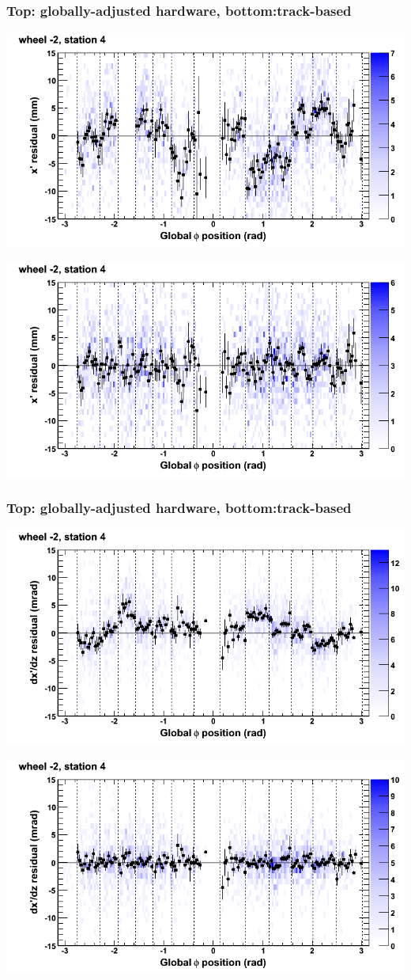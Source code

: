 \documentclass[compress]{beamer}
\begin{document}
\begin{frame}
\frametitle{Top: globally-adjusted hardware, bottom:track-based}
\includegraphics[width=0.7\linewidth]{NOV4_mapplots_HW/DTvsphi_st4whA_x.png}

\includegraphics[width=0.7\linewidth]{NOV4_mapplots/DTvsphi_st4whA_x.png}
\end{frame}

\begin{frame}
\frametitle{Top: globally-adjusted hardware, bottom:track-based}
\includegraphics[width=0.7\linewidth]{NOV4_mapplots_HW/DTvsphi_st4whA_dxdz.png}

\includegraphics[width=0.7\linewidth]{NOV4_mapplots/DTvsphi_st4whA_dxdz.png}
\end{frame}
\end{document}
